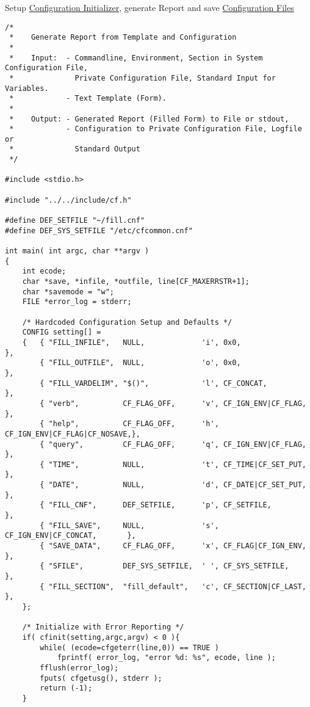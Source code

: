 Setup \hyperlink{config_initializer}{Configuration Initializer}, generate Report and save \hyperlink{config_files}{Configuration Files}



\begin{DocInclude}\begin{verbatim}
/*
 *    Generate Report from Template and Configuration
 *
 *    Input:  - Commandline, Environment, Section in System Configuration File,
 *              Private Configuration File, Standard Input for Variables.
 *            - Text Template (Form).
 *
 *    Output: - Generated Report (Filled Form) to File or stdout,
 *            - Configuration to Private Configuration File, Logfile or
 *              Standard Output
 */

#include <stdio.h>

#include "../../include/cf.h"

#define DEF_SETFILE "~/fill.cnf"
#define DEF_SYS_SETFILE "/etc/cfcommon.cnf"

int main( int argc, char **argv )
{
    int ecode;
    char *save, *infile, *outfile, line[CF_MAXERRSTR+1];
    char *savemode = "w";
    FILE *error_log = stderr;

    /* Hardcoded Configuration Setup and Defaults */
    CONFIG setting[] =
    {   { "FILL_INFILE",   NULL,             'i', 0x0,                        },
        { "FILL_OUTFILE",  NULL,             'o', 0x0,                        },
        { "FILL_VARDELIM", "$()",            'l', CF_CONCAT,                  },
        { "verb",          CF_FLAG_OFF,      'v', CF_IGN_ENV|CF_FLAG,         },
        { "help",          CF_FLAG_OFF,      'h', CF_IGN_ENV|CF_FLAG|CF_NOSAVE,},
        { "query",         CF_FLAG_OFF,      'q', CF_IGN_ENV|CF_FLAG,         },
        { "TIME",          NULL,             't', CF_TIME|CF_SET_PUT,         },
        { "DATE",          NULL,             'd', CF_DATE|CF_SET_PUT,         },
        { "FILL_CNF",      DEF_SETFILE,      'p', CF_SETFILE,                 },
        { "FILL_SAVE",     NULL,             's', CF_IGN_ENV|CF_CONCAT,       },
        { "SAVE_DATA",     CF_FLAG_OFF,      'x', CF_FLAG|CF_IGN_ENV,         },
        { "SFILE",         DEF_SYS_SETFILE,  ' ', CF_SYS_SETFILE,             },
        { "FILL_SECTION",  "fill_default",   'c', CF_SECTION|CF_LAST,         },
    };

    /* Initialize with Error Reporting */
    if( cfinit(setting,argc,argv) < 0 ){
        while( (ecode=cfgeterr(line,0)) == TRUE )
            fprintf( error_log, "error %d: %s", ecode, line );
        fflush(error_log);
        fputs( cfgetusg(), stderr );
        return (-1);
    }


\end{verbatim}
\end{DocInclude}
